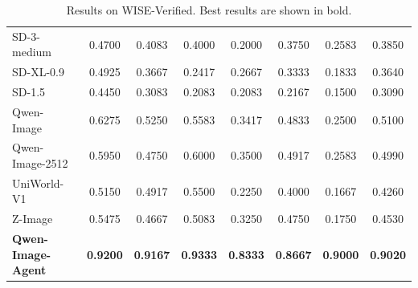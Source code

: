 \documentclass{llmxive}
\begin{document}
\begin{table}[t]
{\begin{tabular}{l|cccccc|c}
SD-3-medium~\citep{sd3Medium} & 0.4700 & 0.4083 & 0.4000 & 0.2000 & 0.3750 & 0.2583 & 0.3850 \\
SD-XL-0.9~\citep{podell2023sdxl} & 0.4925 & 0.3667 & 0.2417 & 0.2667 & 0.3333 & 0.1833 & 0.3640 \\
SD-1.5~\citep{rombach2022high} & 0.4450 & 0.3083 & 0.2083 & 0.2083 & 0.2167 & 0.1500 & 0.3090 \\
Qwen-Image~\citep{wu2025qwen} & 0.6275 & 0.5250 & 0.5583 & 0.3417 & 0.4833 & 0.2500 & 0.5100 \\
Qwen-Image-2512~\citep{wu2025qwen} & 0.5950 & 0.4750 & 0.6000 & 0.3500 & 0.4917 & 0.2583 & 0.4990 \\
UniWorld-V1~\citep{lin2025uniworld} & 0.5150 & 0.4917 & 0.5500 & 0.2250 & 0.4000 & 0.1667 & 0.4260 \\
Z-Image~\citep{cai2025z} & 0.5475 & 0.4667 & 0.5083 & 0.3250 & 0.4750 & 0.1750 & 0.4530 \\
\rowcolor{blue!10}
\textbf{Qwen-Image-Agent} & \textbf{0.9200} & \textbf{0.9167} & \textbf{0.9333} & \textbf{0.8333} & \textbf{0.8667} & \textbf{0.9000} & \textbf{0.9020} \\
\bottomrule
\end{tabular}
}
\caption{Results on WISE-Verified. Best results are shown in bold.}
\label{tab:wise}
\end{table}
\end{document}

